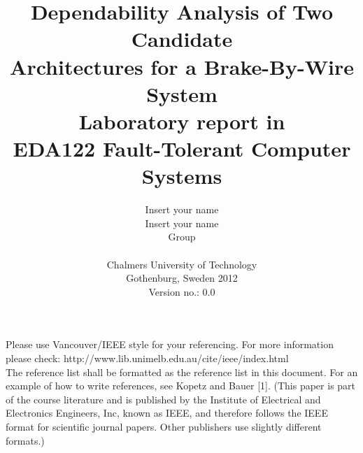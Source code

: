 \documentclass{article}
\title{Dependability Analysis of Two Candidate\\ Architectures for a Brake-By-Wire System \\
\vspace{2.0cm}
\small Laboratory report in \\ EDA122 Fault-Tolerant Computer Systems \\[5ex]} %
\author{Insert your name\\ Insert your name\\ \small Group\\
\vspace{5.0cm}
\\ \small Chalmers University of Technology \\
\small Gothenburg, Sweden 2012\\
\small Version no.: 0.0\\
} %
\begin{document}
\maketitle %
%
%
\newpage
\tableofcontents








\begin{thebibliography}{9}

Please use Vancouver/IEEE style for your referencing. For more information please check: http://www.lib.unimelb.edu.au/cite/ieee/index.html
\\
The reference list shall be formatted as the reference list in this document. For an example of how to write references, see Kopetz and Bauer [1]. (This paper is part of the course literature and is published by the Institute of Electrical and Electronics Engineers, Inc, known as IEEE, and therefore follows the IEEE format for scientific journal papers. Other publishers use slightly different formats.)

\end{thebibliography}
\end{document}
